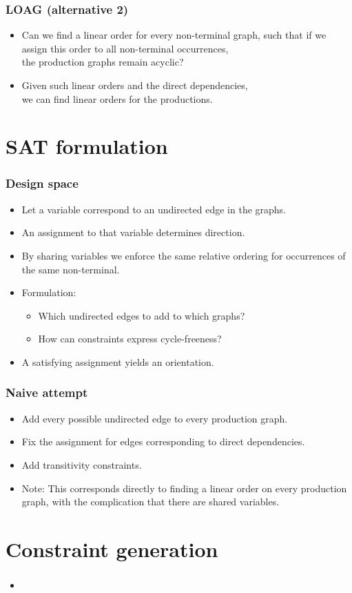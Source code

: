 \documentclass{beamer}
\begin{document}
\begin{frame}
    \frametitle{LOAG (alternative 2)}
    \begin{itemize}
        \item Can we find a linear order for every non-terminal graph,
                such that if we assign this order to all non-terminal occurrences,\\
                the production graphs remain acyclic?
        \item Given such linear orders and the direct dependencies,\\
                 we can find linear orders for the productions.
    \end{itemize}
\end{frame}

\section{SAT formulation}
\begin{frame}
    \frametitle{Design space}
    \begin{itemize}
        \item Let a variable correspond to an undirected edge in the graphs.
        \item An assignment to that variable determines direction.
        \item By sharing variables we enforce the same relative ordering for
                occurrences of the same non-terminal.
        \item Formulation:
        \begin{itemize}
            \item Which undirected edges to add to which graphs?
            \item How can constraints express cycle-freeness?
        \end{itemize}
        \item A satisfying assignment yields an orientation.
    \end{itemize}
\end{frame}

\begin{frame}
    \frametitle{Naive attempt}
    \begin{itemize}
        \item Add every possible undirected edge to every production graph.
        \item Fix the assignment for edges corresponding to direct dependencies.
        \item Add transitivity constraints.
        \item Note: This corresponds directly to finding a linear order on every
                production graph, with the complication that there are shared variables.
    \end{itemize}
\end{frame}


\section{Constraint generation}
\begin{frame}
    \frametitle{}
    \begin{itemize}
        \item
    \end{itemize}
\end{frame}
\end{document}
